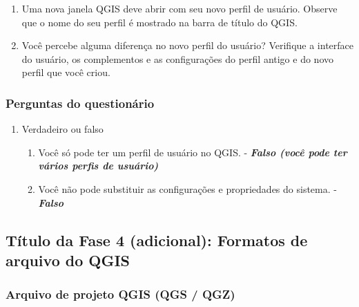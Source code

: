 \documentclass[
]{book}
\providecommand{\tightlist}{%
  \setlength{\itemsep}{0pt}\setlength{\parskip}{0pt}}
\begin{document}
\begin{enumerate}
\def\labelenumi{\arabic{enumi}.}
\setcounter{enumi}{2}
\item
  Uma nova janela QGIS deve abrir com seu novo perfil de usuário. Observe que o nome do seu perfil é mostrado na barra de título do QGIS.
\item
  Você percebe alguma diferença no novo perfil do usuário? Verifique a interface do usuário, os complementos e as configurações do perfil antigo e do novo perfil que você criou.
\end{enumerate}

\hypertarget{perguntas-do-questionuxe1rio-4}{%
\subsubsection{\texorpdfstring{\textbf{Perguntas do questionário}}{Perguntas do questionário}}\label{perguntas-do-questionuxe1rio-4}}

\begin{enumerate}
\def\labelenumi{\arabic{enumi}.}
\tightlist
\item
  Verdadeiro ou falso

  \begin{enumerate}
  \def\labelenumii{\arabic{enumii}.}
  \tightlist
  \item
    Você só pode ter um perfil de usuário no QGIS. - \textbf{\emph{Falso (você pode ter vários perfis de usuário)}}
  \item
    Você não pode substituir as configurações e propriedades do sistema. - \textbf{\emph{Falso}}
  \end{enumerate}
\end{enumerate}

\hypertarget{tuxedtulo-da-fase-4-adicional-formatos-de-arquivo-do-qgis}{%
\subsection{Título da Fase 4 (adicional): Formatos de arquivo do QGIS}\label{tuxedtulo-da-fase-4-adicional-formatos-de-arquivo-do-qgis}}

\hypertarget{arquivo-de-projeto-qgis-qgs-qgz}{%
\subsubsection{\texorpdfstring{\textbf{Arquivo de projeto QGIS (QGS / QGZ)}}{Arquivo de projeto QGIS (QGS / QGZ)}}\label{arquivo-de-projeto-qgis-qgs-qgz}}
\end{document}
